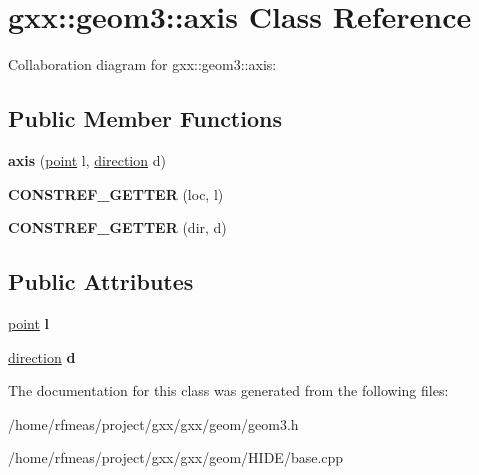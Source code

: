 \hypertarget{classgxx_1_1geom3_1_1axis}{}\section{gxx\+:\+:geom3\+:\+:axis Class Reference}
\label{classgxx_1_1geom3_1_1axis}


Collaboration diagram for gxx\+:\+:geom3\+:\+:axis\+:
\subsection*{Public Member Functions}
\begin{DoxyCompactItemize}
\item 
{\bfseries axis} (\hyperlink{classgxx_1_1geom3_1_1point}{point} l, \hyperlink{classgxx_1_1geom3_1_1direction}{direction} d)\hypertarget{classgxx_1_1geom3_1_1axis_a08fd792af64f78466f31809fbbc646a6}{}\label{classgxx_1_1geom3_1_1axis_a08fd792af64f78466f31809fbbc646a6}

\item 
{\bfseries C\+O\+N\+S\+T\+R\+E\+F\+\_\+\+G\+E\+T\+T\+ER} (loc, l)\hypertarget{classgxx_1_1geom3_1_1axis_adee32a748ca587261f8a7b7f74510b12}{}\label{classgxx_1_1geom3_1_1axis_adee32a748ca587261f8a7b7f74510b12}

\item 
{\bfseries C\+O\+N\+S\+T\+R\+E\+F\+\_\+\+G\+E\+T\+T\+ER} (dir, d)\hypertarget{classgxx_1_1geom3_1_1axis_a5a23fb24c936dbef75e07a92182f4df7}{}\label{classgxx_1_1geom3_1_1axis_a5a23fb24c936dbef75e07a92182f4df7}

\end{DoxyCompactItemize}
\subsection*{Public Attributes}
\begin{DoxyCompactItemize}
\item 
\hyperlink{classgxx_1_1geom3_1_1point}{point} {\bfseries l}\hypertarget{classgxx_1_1geom3_1_1axis_a346d41bf4307d5876fa230ee778973e7}{}\label{classgxx_1_1geom3_1_1axis_a346d41bf4307d5876fa230ee778973e7}

\item 
\hyperlink{classgxx_1_1geom3_1_1direction}{direction} {\bfseries d}\hypertarget{classgxx_1_1geom3_1_1axis_a096551f9e9c6dfff8366fc12ea4d6450}{}\label{classgxx_1_1geom3_1_1axis_a096551f9e9c6dfff8366fc12ea4d6450}

\end{DoxyCompactItemize}


The documentation for this class was generated from the following files\+:\begin{DoxyCompactItemize}
\item 
/home/rfmeas/project/gxx/gxx/geom/geom3.\+h\item 
/home/rfmeas/project/gxx/gxx/geom/\+H\+I\+D\+E/base.\+cpp\end{DoxyCompactItemize}
